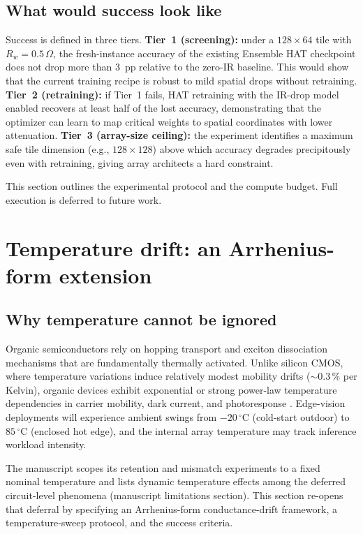 \subsection{What would success look like}

Success is defined in three tiers.  \textbf{Tier~1 (screening):} under a $128 \times 64$ tile with $R_{w}=0.5\,\Omega$, the fresh-instance accuracy of the existing Ensemble HAT checkpoint does not drop more than $3$~pp relative to the zero-IR baseline.  This would show that the current training recipe is robust to mild spatial drops without retraining.  \textbf{Tier~2 (retraining):} if Tier~1 fails, HAT retraining with the IR-drop model enabled recovers at least half of the lost accuracy, demonstrating that the optimizer can learn to map critical weights to spatial coordinates with lower attenuation.  \textbf{Tier~3 (array-size ceiling):} the experiment identifies a maximum safe tile dimension (e.g., $128 \times 128$) above which accuracy degrades precipitously even with retraining, giving array architects a hard constraint.

This section outlines the experimental protocol and the compute budget.  Full execution is deferred to future work.


\section{Temperature drift: an Arrhenius-form extension}
\label{sec:temperature-drift}

\subsection{Why temperature cannot be ignored}

Organic semiconductors rely on hopping transport and exciton dissociation mechanisms that are fundamentally thermally activated.  Unlike silicon CMOS, where temperature variations induce relatively modest mobility drifts ($\sim$$0.3\,\%$ per Kelvin), organic devices exhibit exponential or strong power-law temperature dependencies in carrier mobility, dark current, and photoresponse \citep{organicthermal2025}.  Edge-vision deployments will experience ambient swings from $-20\,^{\circ}\mathrm{C}$ (cold-start outdoor) to $85\,^{\circ}\mathrm{C}$ (enclosed hot edge), and the internal array temperature may track inference workload intensity.

The manuscript scopes its retention and mismatch experiments to a fixed nominal temperature and lists dynamic temperature effects among the deferred circuit-level phenomena (manuscript limitations section).  This section re-opens that deferral by specifying an Arrhenius-form conductance-drift framework, a temperature-sweep protocol, and the success criteria.

